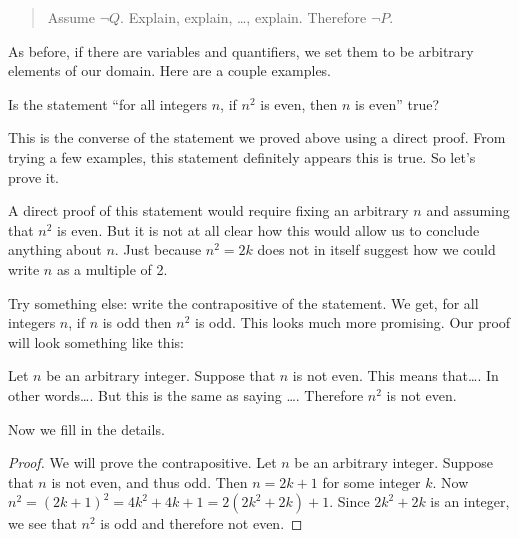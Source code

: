 \documentclass[12pt]{article}
\begin{document}
\begin{quote}
Assume $\neg Q$.  Explain, explain, \ldots, explain.  Therefore $\neg P$.
\end{quote}
 
As before, if there are variables and quantifiers, we set them to be arbitrary elements of our domain.  Here are a couple examples.
 
 \begin{example}
   Is the statement ``for all integers $n$, if $n^2$ is even, then $n$ is even'' true?  
   \begin{solution}
     This is the converse of the statement we proved above using a direct proof.  From trying a few examples, this statement definitely appears this is true.  So let's prove it.
     
     A direct proof of this statement would require fixing an arbitrary $n$ and assuming that $n^2$ is even.  But it is not at all clear how this would allow us to conclude anything about $n$.  Just because $n^2 = 2k$ does not in itself suggest how we could write $n$ as a multiple of 2.  
     
     Try something else: write the contrapositive of the statement.  We get, for all integers $n$, if $n$ is odd then $n^2$ is odd.  This looks much more promising.  Our proof will look something like this:
     
     Let $n$ be an arbitrary integer.  Suppose that $n$ is not even.  This means that\ldots.  In other words\ldots.  But this is the same as saying \ldots.  Therefore $n^2$ is not even.
     
     Now we fill in the details.
     \begin{proof}
       We will prove the contrapositive.  Let $n$ be an arbitrary integer.  Suppose that $n$ is not even, and thus odd.  Then $n= 2k+1$ for some integer $k$.  Now $n^2 = (2k+1)^2 = 4k^2 + 4k + 1 = 2(2k^2 + 2k) + 1$.  Since $2k^2 + 2k$ is an integer, we see that $n^2$ is odd and therefore not even.
     \end{proof}
   \end{solution}
 \end{example}
   
\end{document}
